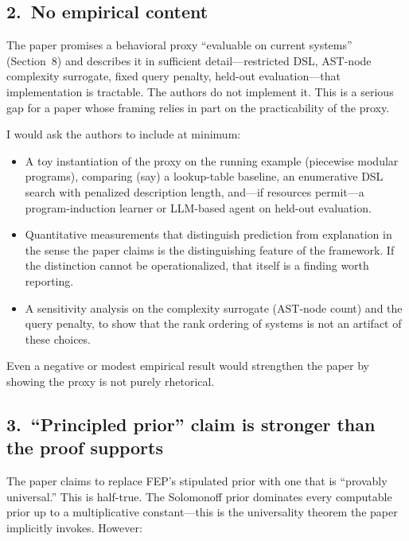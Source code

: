\documentclass[11pt]{article}
\begin{document}
\subsection*{2.\ No empirical content}

The paper promises a behavioral proxy ``evaluable on current systems'' (Section~8) and describes it in sufficient detail---restricted DSL, AST-node complexity surrogate, fixed query penalty, held-out evaluation---that implementation is tractable. The authors do not implement it. This is a serious gap for a paper whose framing relies in part on the practicability of the proxy.

I would ask the authors to include at minimum:

\begin{itemize}[leftmargin=*]
\item A toy instantiation of the proxy on the running example (piecewise modular programs), comparing (say) a lookup-table baseline, an enumerative DSL search with penalized description length, and---if resources permit---a program-induction learner or LLM-based agent on held-out evaluation.
\item Quantitative measurements that distinguish prediction from explanation in the sense the paper claims is the distinguishing feature of the framework. If the distinction cannot be operationalized, that itself is a finding worth reporting.
\item A sensitivity analysis on the complexity surrogate (AST-node count) and the query penalty, to show that the rank ordering of systems is not an artifact of these choices.
\end{itemize}

Even a negative or modest empirical result would strengthen the paper by showing the proxy is not purely rhetorical.

\subsection*{3.\ ``Principled prior'' claim is stronger than the proof supports}

The paper claims to replace FEP's stipulated prior with one that is ``provably universal.'' This is half-true. The Solomonoff prior dominates every computable prior up to a multiplicative constant---this is the universality theorem the paper implicitly invokes. However:
\end{document}
